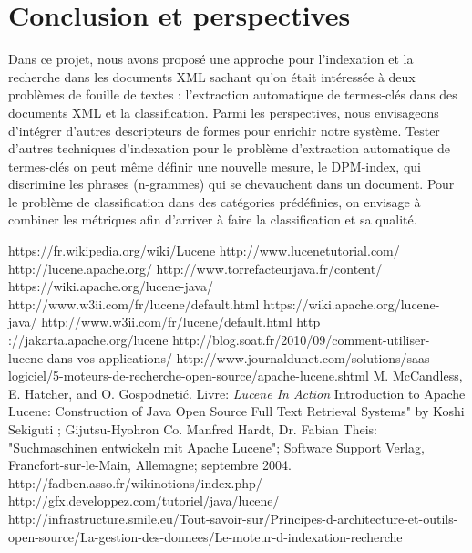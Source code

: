 \documentclass[12pt]{report}
\begin{document}
\section{Conclusion et perspectives}

Dans ce projet, nous avons proposé une approche pour l’indexation et la recherche dans les documents XML sachant qu’on était intéressée à deux problèmes de fouille de textes : l’extraction automatique de termes-clés dans des documents XML et la classification.
Parmi les perspectives, nous envisageons d’intégrer d’autres descripteurs de formes pour enrichir notre système. Tester d’autres techniques d’indexation pour le problème d’extraction automatique de termes-clés on peut même définir une nouvelle mesure, le DPM-index, qui discrimine les phrases (n-grammes) qui se chevauchent dans un document. Pour le problème de classification dans des catégories prédéfinies, on envisage à combiner les métriques afin d’arriver à faire la classification et sa qualité.

\newpage


%

\begin{thebibliography}{1}

https://fr.wikipedia.org/wiki/Lucene
http://www.lucenetutorial.com/
http://lucene.apache.org/
http://www.torrefacteurjava.fr/content/
https://wiki.apache.org/lucene-java/
http://www.w3ii.com/fr/lucene/default.html
https://wiki.apache.org/lucene-java/
http://www.w3ii.com/fr/lucene/default.html
http ://jakarta.apache.org/lucene
http://blog.soat.fr/2010/09/comment-utiliser-lucene-dans-vos-applications/
http://www.journaldunet.com/solutions/saas-logiciel/5-moteurs-de-recherche-open-source/apache-lucene.shtml
M. McCandless, E. Hatcher, and O. Gospodnetić.
\newblock Livre:  {\em Lucene In Action}
Introduction to Apache Lucene: Construction of Java Open Source Full Text Retrieval Systems" by Koshi Sekiguti ; Gijutsu-Hyohron Co.
Manfred Hardt, Dr. Fabian Theis: "Suchmaschinen entwickeln mit Apache Lucene"; Software  Support Verlag, Francfort-sur-le-Main, Allemagne; septembre 2004.
http://fadben.asso.fr/wikinotions/index.php/
http://gfx.developpez.com/tutoriel/java/lucene/
http://infrastructure.smile.eu/Tout-savoir-sur/Principes-d-architecture-et-outils-open-source/La-gestion-des-donnees/Le-moteur-d-indexation-recherche
\end{thebibliography}
\end{document}
